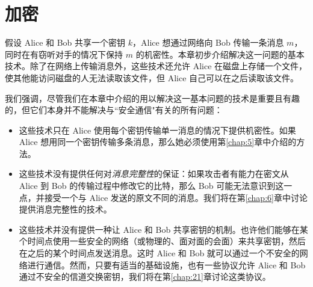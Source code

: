 \chapter{加密}\label{chap:2}

假设 Alice 和 Bob 共享一个密钥 $k$，Alice 想通过网络向 Bob 传输一条消息 $m$，同时在有窃听对手的情况下保持 $m$ 的机密性。本章初步介绍解决这一问题的基本技术。除了在网络上传输消息外，这些技术还允许 Alice 在磁盘上存储一个文件，使其他能访问磁盘的人无法读取该文件，但 Alice 自己可以在之后读取该文件。

我们强调，尽管我们在本章中介绍的用以解决这一基本问题的技术是重要且有趣的，但它们本身并不能解决与``安全通信"有关的所有问题：
\begin{itemize}
	\item 这些技术只在 Alice 使用每个密钥传输单一消息的情况下提供机密性。如果 Alice 想用同一个密钥传输多条消息，那么她必须使用第\ref{chap:5}章中介绍的方法。
	\item 这些技术没有提供任何对\emph{消息完整性}的保证：如果攻击者有能力在密文从 Alice 到 Bob 的传输过程中修改它的比特，那么 Bob 可能无法意识到这一点，并接受一个与 Alice 发送的原文不同的消息。我们将在第\ref{chap:6}章中讨论提供消息完整性的技术。
	\item 这些技术并没有提供一种让 Alice 和 Bob 共享密钥的机制。也许他们能够在某个时间点使用一些安全的网络（或物理的、面对面的会面）来共享密钥，然后在之后的某个时间点发送消息。这时 Alice 和 Bob 就可以通过一个不安全的网络进行通信。然而，只要有适当的基础设施，也有一些协议允许 Alice 和 Bob 通过不安全的信道交换密钥，我们将在第\ref{chap:21}章讨论这类协议。
\end{itemize}






